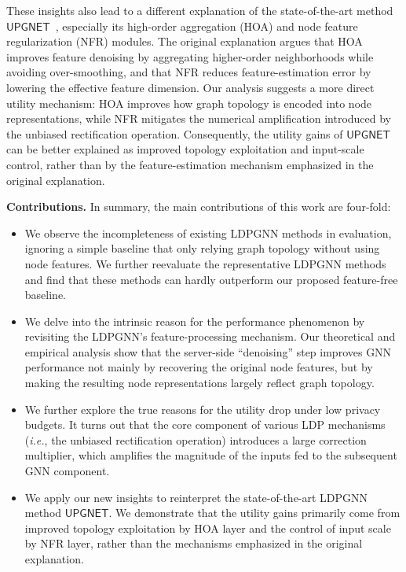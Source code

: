 \documentclass[conference,compsoc]{IEEEtran}
\newcommand{\ie}{\textit{i.e.}\xspace}
\theoremstyle{boldplain}
\theoremstyle{bolddefinition}
\theoremstyle{remark}
\newcommand{\mypara}[1]{\noindent\textbf{#1.}\xspace}
\newcommand{\hoa}{HOA\xspace}
\newcommand{\ldpgnn}{LDPGNN\xspace}
\newcommand{\upgnet}{\ensuremath{\mathsf{UPGNET}}\xspace}
\newcommand{\nfr}{NFR\xspace}
\begin{document}
These insights also lead to a different explanation of the state-of-the-art method \upgnet~\cite{upgnet-cite}, especially its high-order aggregation (\hoa) and node feature regularization (\nfr) modules.
The original explanation argues that \hoa improves feature denoising by aggregating higher-order neighborhoods while avoiding over-smoothing, and that \nfr reduces feature-estimation error by lowering the effective feature dimension.
Our analysis suggests a more direct utility mechanism:
\hoa improves how graph topology is encoded into node representations, while \nfr mitigates the numerical amplification introduced by the unbiased rectification operation.
Consequently, the utility gains of \upgnet can be better explained as improved topology exploitation and input-scale control, rather than by the feature-estimation mechanism emphasized in the original explanation.







\mypara{Contributions}
In summary, the main contributions of this work are four-fold:
\begin{itemize}

    \item We observe the incompleteness of existing \ldpgnn methods in evaluation, ignoring a simple baseline that only relying graph topology without using node features.
    We further reevaluate
    the representative \ldpgnn methods and find that these methods can hardly outperform our proposed feature-free baseline. 

    \item We delve into the intrinsic reason for the performance phenomenon by revisiting the LDPGNN’s feature-processing mechanism. 
    Our theoretical and empirical analysis show that the server-side ``denoising'' step improves GNN performance not mainly by recovering the original node features, but by making the resulting node representations largely reflect graph topology.     

    \item We further explore the true reasons for the utility drop under low privacy budgets.
    It turns out that the core component of various LDP mechanisms (\ie, the unbiased rectification operation) introduces a large correction multiplier, which amplifies the magnitude of the inputs fed to the subsequent GNN component.

    \item We apply our new insights to reinterpret the state-of-the-art \ldpgnn method \upgnet.
    We demonstrate that the utility gains primarily come from improved topology exploitation by \hoa layer and the control of input scale by \nfr layer, rather than the mechanisms emphasized in the original explanation.
    
\end{itemize}
\end{document}
